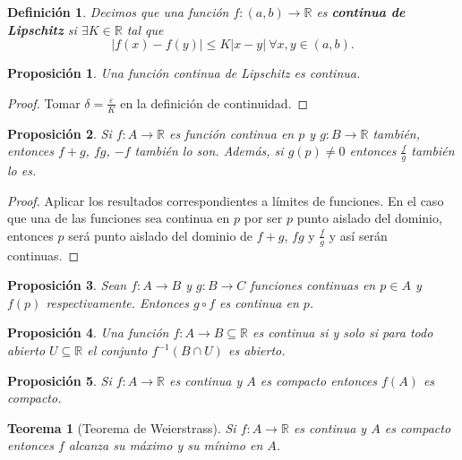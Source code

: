 \documentclass{article}
\newtheorem{theorem}{Teorema}
\newtheorem{prop}{Proposición}
\newtheorem{define}{Definición}
\newcommand{\reales}{\mathbb{R}}
\begin{document}
\begin{define}
	Decimos que una función $f: (a, b) \rightarrow \reales$ es \textbf{continua de Lipschitz} si $\exists K \in \reales$ tal que
	\begin{equation*}
		|f(x) - f(y)| \leq K|x - y|\ \forall x,y \in (a, b).
	\end{equation*}
\end{define}

\begin{prop}
	Una función continua de Lipschitz es continua.
\end{prop}

\begin{proof}
	Tomar $\delta = \frac{\varepsilon}{K}$ en la definición de continuidad. 
\end{proof}

\begin{prop}
	Si $f: A \rightarrow \reales$ es función continua en $p$ y $g: B \rightarrow \reales$ también, entonces $f + g$, $fg$, $-f$ también lo son. Además, si $g(p) \neq 0$ entonces $\frac{f}{g}$ también lo es.
\end{prop}

\begin{proof}
	Aplicar los resultados correspondientes a límites de funciones. En el caso que una de las funciones sea continua en $p$ por ser $p$ punto aislado del dominio, entonces $p$ será punto aislado del dominio de $f+g$, $fg$ y $\frac{f}{g}$ y así serán continuas.
\end{proof}

\begin{prop}
	Sean $f: A \rightarrow B$ y $g: B \rightarrow C$ funciones continuas en $p\in A$ y $f(p)$ respectivamente. Entonces $g \circ f$ es continua en $p$.
\end{prop}

\begin{prop}
	Una función $f: A \rightarrow B \subseteq \reales$ es continua si y solo si para todo abierto $U \subseteq \reales$ el conjunto $f^{-1}(B \cap U)$ es abierto.
\end{prop}

\begin{prop}
	Si $f: A \rightarrow \reales$ es continua y $A$ es compacto entonces $f(A)$ es compacto. 
\end{prop}

\begin{theorem}[Teorema de Weierstrass]
	Si $f: A \rightarrow \reales$ es continua y $A$ es compacto entonces $f$ alcanza su máximo y su mínimo en $A$.
\end{theorem}
\end{document}
